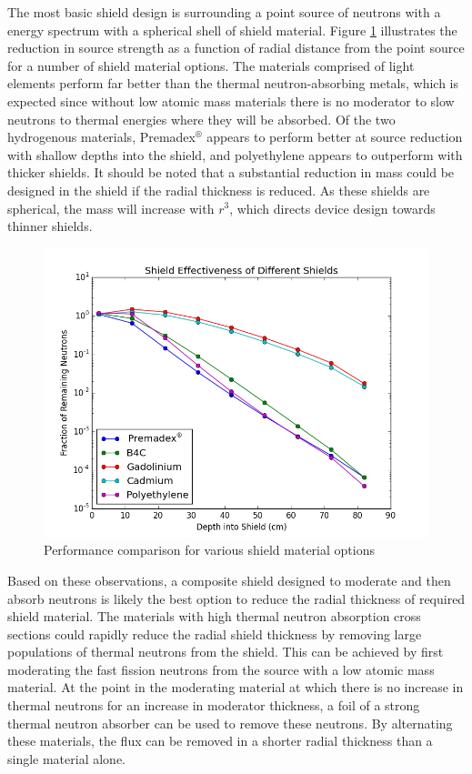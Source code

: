 \documentclass{mc2015}
\begin{document}
The most basic shield design is surrounding a point source of neutrons with a  energy spectrum with a spherical shell of shield material. Figure \ref{fig:basics} illustrates the reduction in source strength as a function of radial distance from the point source for a number of shield material options.%
The materials comprised of light elements perform far better than the thermal neutron-absorbing metals, which is expected since without low atomic mass materials there is no moderator to slow neutrons to thermal energies where they will be absorbed. Of the two hydrogenous materials, Premadex$^\circledR$ appears to perform better at source reduction with shallow depths into the shield, and polyethylene appears to outperform with thicker shields. It should be noted that a substantial reduction in mass could be designed in the shield if the radial thickness is reduced. As these shields are spherical, the mass will increase with $r^3$, which directs device design towards thinner shields.  


\begin{figure}
  \centering
  \includegraphics[width=4.5in]{Basics3.png}
  \caption{Performance comparison for various shield material options}
  \label{fig:basics}
\end{figure}

Based on these observations, a composite shield designed to moderate and then absorb neutrons is likely the best option to reduce the radial thickness of required shield material. The materials with high thermal neutron absorption cross sections could rapidly reduce the radial shield thickness by removing large populations of thermal neutrons from the shield. This can be achieved by first moderating the fast fission neutrons from the  source with a low atomic mass material. At the point in the moderating material at which there is no increase in thermal neutrons for an increase in moderator thickness, a foil of a strong thermal neutron absorber can be used to remove these neutrons. By alternating these materials, the flux can be removed in a shorter radial thickness than a single material alone. 
\end{document}
